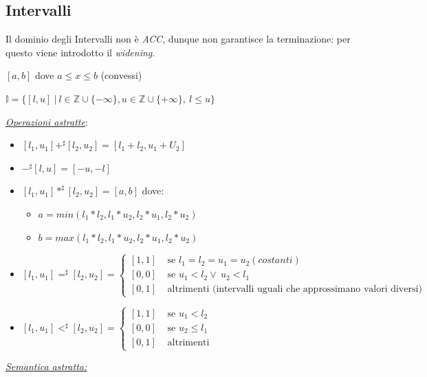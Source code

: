 \documentclass[a4paper, 10pt]{book}
\begin{document}
\newpage
\subsection{Intervalli}
Il dominio degli Intervalli non è \textit{ACC}, dunque non garantisce la terminazione: per questo viene introdotto il \textit{widening}.

\begin{center}
	$[a, b]$ dove $a\leq x\leq b$ (convessi)
	
	$\mathbb{I} = \{[l, u] ~|~ l\in \mathbb{Z}\cup \{-\infty\}, u\in\mathbb{Z}\cup \{+\infty\}, ~l\leq u\}$
\end{center}

\noindent
\textit{\underline{Operazioni astratte}}:
\begin{itemize}
	\item $[l_1, u_1] +^\sharp [l_2, u_2] = [l_1 + l_2, u_1 + U_2]$
	\item $-^\sharp[l, u] = [-u, -l]$
	\item $[l_1, u_1] *^\sharp [l_2, u_2] = [a, b]$ dove:
	\begin{itemize}
		\item $a=min(l_1*l_2, l_1*u_2, l_2*u_1, l_2*u_2)$
		\item $b=max(l_1*l_2, l_1*u_2, l_2*u_1, l_2*u_2)$
	\end{itemize}
	\item $[l_1, u_1] =^\sharp [l_2, u_2] =
	\begin{cases}
	[1, 1] &\text{ se } l_1=l_2=u_1=u_2 (costanti) \\
	[0, 0] &\text{ se } u_1 < l_2 \lor ~u_2 < l_1\\
	[0, 1] &\text{ altrimenti (intervalli uguali che approssimano valori diversi) }
	\end{cases}$
	\item $[l_1, u_1] <^\sharp [l_2, u_2] =
	\begin{cases}
	[1, 1] &\text{ se } u_1<l_2 \\
	[0, 0] &\text{ se } u_2 \leq l_1 \\
	[0, 1] &\text{ altrimenti }
	\end{cases}$
\end{itemize}

\underline{\textit{Semantica astratta:}}
\end{document}
